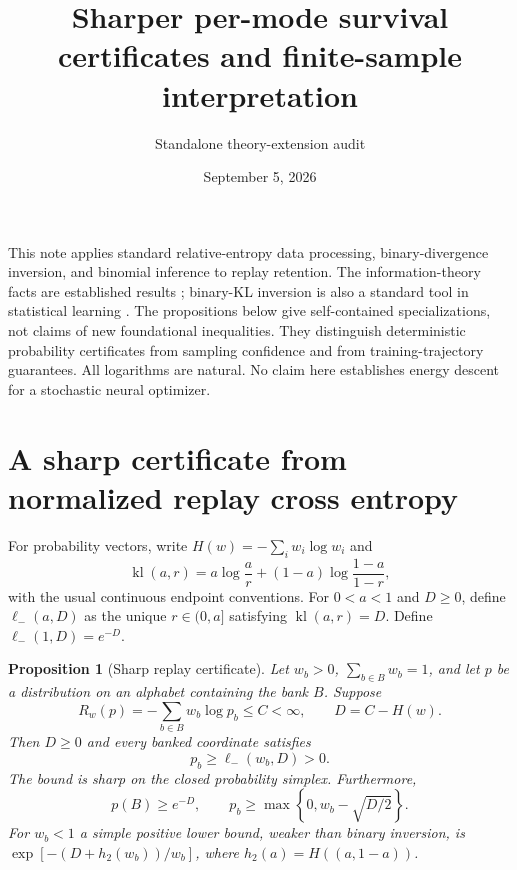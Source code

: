\documentclass[11pt]{article}
\title{Sharper per-mode survival certificates and finite-sample interpretation}
\author{Standalone theory-extension audit}
\date{September 5, 2026}
\newtheorem{proposition}{Proposition}
\DeclareMathOperator{\kl}{kl}
\begin{document}
\maketitle

This note applies standard relative-entropy data processing, binary-divergence
inversion, and binomial inference to replay retention. The information-theory
facts are established results \cite{vanerven2014}; binary-KL inversion is also a
standard tool in statistical learning \cite{garivier2011}. The propositions
below give self-contained specializations, not claims of new foundational
inequalities. They distinguish deterministic probability certificates from
sampling confidence and from training-trajectory guarantees. All logarithms are
natural. No claim here establishes energy descent for a stochastic neural
optimizer.

\section{A sharp certificate from normalized replay cross entropy}
For probability vectors, write $H(w)=-\sum_iw_i\log w_i$ and
\[
 \kl(a,r)=a\log\frac a r+(1-a)\log\frac{1-a}{1-r},
\]
with the usual continuous endpoint conventions. For $0<a<1$ and $D\ge0$,
define $\ell_-(a,D)$ as the unique $r\in(0,a]$ satisfying
$\kl(a,r)=D$. Define $\ell_-(1,D)=e^{-D}$.

\begin{proposition}[Sharp replay certificate]
Let $w_b>0$, $\sum_{b\in B}w_b=1$, and let $p$ be a distribution on an
alphabet containing the bank $B$. Suppose
\[
 R_w(p)=-\sum_{b\in B}w_b\log p_b\le C<\infty,
 \qquad D=C-H(w).
\]
Then $D\ge0$ and every banked coordinate satisfies
\[
 p_b\ge\ell_-(w_b,D)>0.
\]
The bound is sharp on the closed probability simplex. Furthermore,
\[
 p(B)\ge e^{-D},\qquad
 p_b\ge\max\left\{0,w_b-\sqrt{D/2}\right\}.
\]
For $w_b<1$ a simple positive lower bound, weaker than binary inversion, is
$\exp[-(D+h_2(w_b))/w_b]$, where $h_2(a)=H((a,1-a))$.
\end{proposition}
\end{document}
